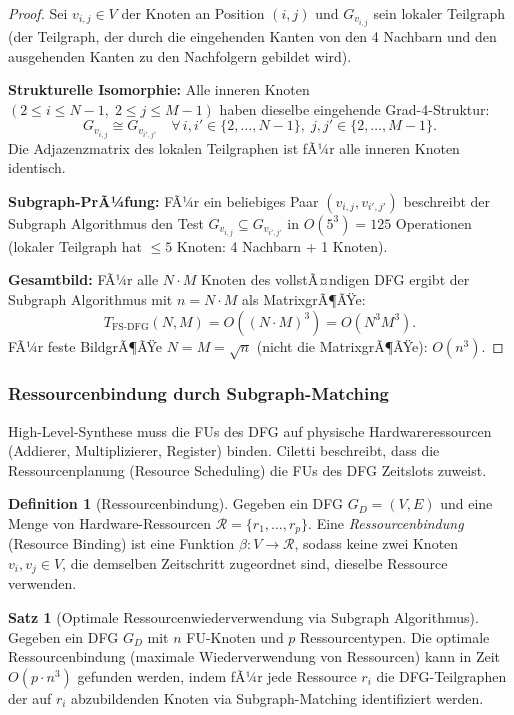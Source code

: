 ﻿\documentclass[a4paper,12pt]{article}
\theoremstyle{definition}
\newtheorem{definition}{Definition}
\newtheorem{satz}{Satz}
\begin{document}
\begin{proof}
  Sei $v_{i,j} \in V$ der Knoten an Position $(i,j)$ und $G_{v_{i,j}}$ sein lokaler
  Teilgraph (der Teilgraph, der durch die eingehenden Kanten von den 4 Nachbarn und
  den ausgehenden Kanten zu den Nachfolgern gebildet wird).

  \textbf{Strukturelle Isomorphie:} Alle inneren Knoten $(2 \leq i \leq N-1,\;
  2 \leq j \leq M-1)$ haben dieselbe eingehende Grad-4-Struktur:
  \[
    G_{v_{i,j}} \cong G_{v_{i',j'}} \quad \forall\, i,i' \in \{2,\ldots,N-1\},\;
    j,j' \in \{2,\ldots,M-1\}.
  \]
  Die Adjazenzmatrix des lokalen Teilgraphen ist fÃ¼r alle inneren Knoten identisch.

  \textbf{Subgraph-PrÃ¼fung:} FÃ¼r ein beliebiges Paar $(v_{i,j}, v_{i',j'})$ beschreibt
  der Subgraph Algorithmus den Test $G_{v_{i,j}} \subseteq G_{v_{i',j'}}$ in
  $O(5^3) = 125$ Operationen (lokaler Teilgraph hat $\leq 5$ Knoten: 4 Nachbarn + 1 Knoten).

  \textbf{Gesamtbild:} FÃ¼r alle $N \cdot M$ Knoten des vollstÃ¤ndigen DFG ergibt der
  Subgraph Algorithmus mit $n = N \cdot M$ als MatrixgrÃ¶ÃŸe:
  \[
    T_{\text{FS-DFG}}(N,M) = O((N \cdot M)^3) = O(N^3 M^3).
  \]
  FÃ¼r feste BildgrÃ¶ÃŸe $N = M = \sqrt{n}$ (nicht die MatrixgrÃ¶ÃŸe): $O(n^3)$.
\end{proof}

\subsubsection{Ressourcenbindung durch Subgraph-Matching}

High-Level-Synthese muss die FUs des DFG auf physische Hardwareressourcen (Addierer,
Multiplizierer, Register) binden. Ciletti \cite[S.~576]{ciletti2011} beschreibt, dass
die Ressourcenplanung (Resource Scheduling) die FUs des DFG Zeitslots zuweist.

\begin{definition}[Ressourcenbindung]\label{def:ressourcenbindung}
  Gegeben ein DFG $G_D = (V, E)$ und eine Menge von Hardware-Ressourcen
  $\mathcal{R} = \{r_1, \ldots, r_p\}$. Eine \emph{Ressourcenbindung} (Resource Binding)
  ist eine Funktion $\beta: V \to \mathcal{R}$, sodass keine zwei Knoten $v_i, v_j \in V$,
  die demselben Zeitschritt zugeordnet sind, dieselbe Ressource verwenden.
\end{definition}

\begin{satz}[Optimale Ressourcenwiederverwendung via Subgraph Algorithmus]\label{satz:res_bind}
  Gegeben ein DFG $G_D$ mit $n$ FU-Knoten und $p$ Ressourcentypen. Die optimale
  Ressourcenbindung (maximale Wiederverwendung von Ressourcen) kann in Zeit $O(p \cdot n^3)$
  gefunden werden, indem fÃ¼r jede Ressource $r_i$ die DFG-Teilgraphen der auf $r_i$
  abzubildenden Knoten via Subgraph-Matching identifiziert werden.
\end{satz}
\end{document}

